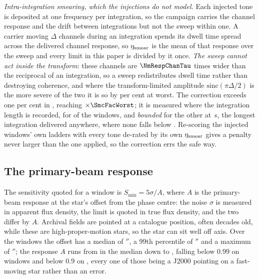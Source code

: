 \emph{Intra-integration smearing, which the injections do not model.} Each
injected tone is deposited at one frequency per integration, so the campaign
carries the channel response and the drift between integrations but not the
sweep within one. A carrier moving $\Delta$ channels during an integration
spends its dwell time spread across the delivered channel response, so
$\eta_{\rm smear}$ is the mean of that response over the sweep and every
limit in this paper is divided by it once. \emph{The sweep cannot act inside
the transform}: these channels are $\NmRespChanTau$ times wider than the
reciprocal of an integration, so a sweep redistributes dwell time rather than
destroying coherence, and where the transform-limited amplitude
$\mathrm{sinc}(\pi\Delta/2)$ is the more severe of the two it is so by
\NmRespOverPct{} per cent at worst. The correction exceeds one per cent in
\NmRespNApplied, reaching $\times\SmcFacWorst$; it is measured where the
integration length is recorded, for \SmcNMeas{} of the \NWindows{} windows,
and \emph{bounded} for the other \SmcNBound{} at \SmcDtCeil\,s, the longest
integration delivered anywhere, where none falls below \SmcBoundEta.
Re-scoring the \SmcValNWin{} injected windows' own ladders with every tone
de-rated by its own $\eta_{\rm smear}$ gives a penalty never larger than the
one applied, so the correction errs the safe way.

\subsection{The primary-beam response}
\label{app:pbresp}

The sensitivity quoted for a window is $S_{\min}=5\sigma/A$, where $A$ is the
primary-beam response at the star's offset from the phase centre: the noise
$\sigma$ is measured in apparent flux density, the limit is quoted in true
flux density, and the two differ by $A$. Archival fields are
pointed at a catalogue position, often decades old, while these are
high-proper-motion stars, so the star can sit well off axis. Over the
\PbNWin{} windows the offset has a median of \PbOffMed$''$, a 99th
percentile of \PbOffPNN$''$ and a maximum of \BmOffMax$''$; the response $A$
runs from \BmRespMed{} in the median down to \BmRespMin, falling below $0.99$
on \PbNLowNN{} windows and below $0.9$ on \BmNBelowNine, every one of
those being a J2000 pointing on a fast-moving star rather than an error.


